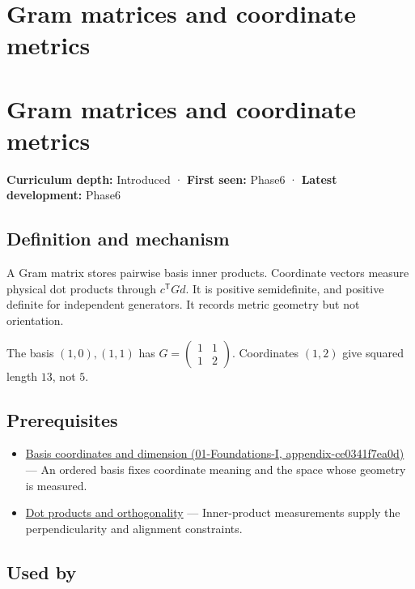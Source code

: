 \hypertarget{appendix-3b863809f82a}{}
\section*{Gram matrices and coordinate metrics}
\section{Gram matrices and coordinate metrics}\label{appendix-3b863809f82a-gram-matrices-and-coordinate-metrics}

\textbf{Curriculum depth:} Introduced · \textbf{First seen:} Phase6 · \textbf{Latest development:} Phase6

\subsection{Definition and mechanism}\label{appendix-3b863809f82a-definition-and-mechanism}

A Gram matrix stores pairwise basis inner products. Coordinate vectors measure physical dot products through \(c^\mathsf TGd\). It is positive semidefinite, and positive definite for independent generators. It records metric geometry but not orientation.

The basis \((1,0),(1,1)\) has \(G=\begin{pmatrix}1&1\\1&2\end{pmatrix}\). Coordinates \((1,2)\) give squared length \(13\), not \(5\).

\subsection{Prerequisites}\label{appendix-3b863809f82a-prerequisites}

\begin{itemize}
\tightlist
\item
  \href{../01-Foundations-I/main.pdf\#nameddest=appendix-ce0341f7ea0d}{Basis coordinates and dimension (01-Foundations-I, appendix-ce0341f7ea0d)} --- An ordered basis fixes coordinate meaning and the space whose geometry is measured.
\item
  \hyperref[appendix-8bc4e8fc547c]{Dot products and orthogonality} --- Inner-product measurements supply the perpendicularity and alignment constraints.
\end{itemize}

\subsection{Used by}\label{appendix-3b863809f82a-used-by}

